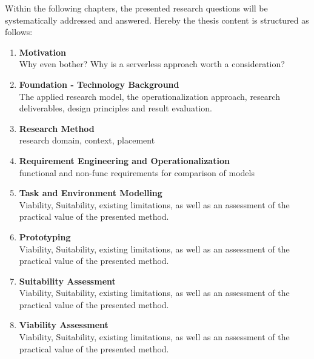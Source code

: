 \begin{minipage}{\textwidth}

    Within the following chapters, the presented research questions will be systematically addressed and answered. Hereby the thesis content is structured as follows:
    
    \begin{enumerate}
             \item \textbf{Motivation} \\
             Why even bother? Why is a serverless approach worth a consideration?   

             \item \textbf{Foundation - Technology Background} \\ 
             The applied research model, the operationalization approach, research deliverables, design principles and result evaluation. 

             \item \textbf{Research Method} \\
             research domain, context, placement 

             \item \textbf{Requirement Engineering and Operationalization} \\
             functional and non-func requirements for comparison of models 

             \item \textbf{Task and Environment Modelling} \\
             Viability, Suitability, existing limitations, as well as an assessment of the practical value of the presented method. 

             \item \textbf{Prototyping} \\
             Viability, Suitability, existing limitations, as well as an assessment of the practical value of the presented method. 

             \item \textbf{Suitability Assessment} \\
             Viability, Suitability, existing limitations, as well as an assessment of the practical value of the presented method. 

             \item \textbf{Viability Assessment} \\
             Viability, Suitability, existing limitations, as well as an assessment of the practical value of the presented method. 


\end{enumerate}
\end{minipage}
